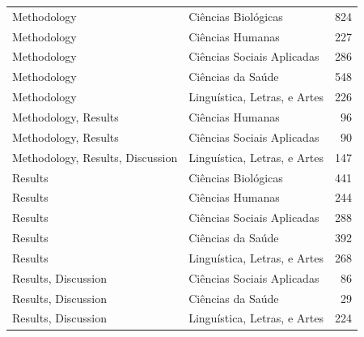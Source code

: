 \begin{longtable}{llr}
Methodology & Ciências Biológicas & 824 \\
Methodology & Ciências Humanas & 227 \\
Methodology & Ciências Sociais Aplicadas & 286 \\
Methodology & Ciências da Saúde & 548 \\
Methodology & Linguística, Letras, e Artes & 226 \\
Methodology, Results & Ciências Humanas & 96 \\
Methodology, Results & Ciências Sociais Aplicadas & 90 \\
Methodology, Results, Discussion & Linguística, Letras, e Artes & 147 \\
Results & Ciências Biológicas & 441 \\
Results & Ciências Humanas & 244 \\
Results & Ciências Sociais Aplicadas & 288 \\
Results & Ciências da Saúde & 392 \\
Results & Linguística, Letras, e Artes & 268 \\
Results, Discussion & Ciências Sociais Aplicadas & 86 \\
Results, Discussion & Ciências da Saúde & 29 \\
Results, Discussion & Linguística, Letras, e Artes & 224 \\
\end{longtable}
